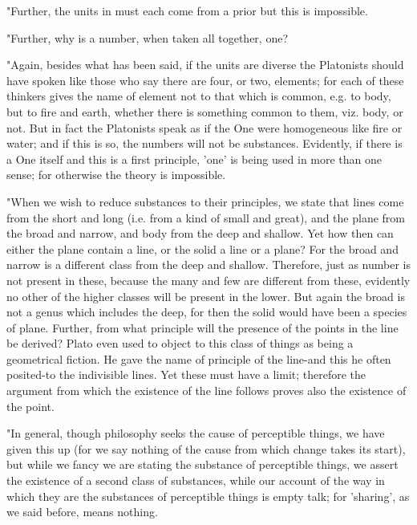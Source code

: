 "Further, the units in must each come from a prior but this is impossible.

"Further, why is a number, when taken all together, one?

"Again, besides what has been said, if the units are diverse the Platonists
should have spoken like those who say there are four, or two, elements;
for each of these thinkers gives the name of element not to that which
is common, e.g. to body, but to fire and earth, whether there is something
common to them, viz. body, or not. But in fact the Platonists speak
as if the One were homogeneous like fire or water; and if this is
so, the numbers will not be substances. Evidently, if there is a One
itself and this is a first principle, 'one' is being used in more
than one sense; for otherwise the theory is impossible. 

"When we wish to reduce substances to their principles, we state that
lines come from the short and long (i.e. from a kind of small and
great), and the plane from the broad and narrow, and body from the
deep and shallow. Yet how then can either the plane contain a line,
or the solid a line or a plane? For the broad and narrow is a different
class from the deep and shallow. Therefore, just as number is not
present in these, because the many and few are different from these,
evidently no other of the higher classes will be present in the lower.
But again the broad is not a genus which includes the deep, for then
the solid would have been a species of plane. Further, from what principle
will the presence of the points in the line be derived? Plato even
used to object to this class of things as being a geometrical fiction.
He gave the name of principle of the line-and this he often posited-to
the indivisible lines. Yet these must have a limit; therefore the
argument from which the existence of the line follows proves also
the existence of the point. 

"In general, though philosophy seeks the cause of perceptible things,
we have given this up (for we say nothing of the cause from which
change takes its start), but while we fancy we are stating the substance
of perceptible things, we assert the existence of a second class of
substances, while our account of the way in which they are the substances
of perceptible things is empty talk; for 'sharing', as we said before,
means nothing. 

